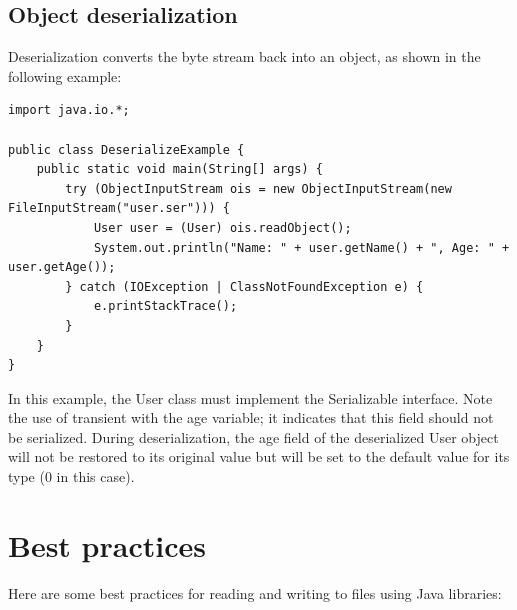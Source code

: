 \subsection{Object deserialization}


Deserialization converts the byte stream back into an object, as shown in the following example:

\begin{lstlisting}
import java.io.*;

public class DeserializeExample {
    public static void main(String[] args) {
        try (ObjectInputStream ois = new ObjectInputStream(new FileInputStream("user.ser"))) {
            User user = (User) ois.readObject();
            System.out.println("Name: " + user.getName() + ", Age: " + user.getAge());
        } catch (IOException | ClassNotFoundException e) {
            e.printStackTrace();
        }
    }
}
\end{lstlisting}

In this example, the User class must implement the Serializable interface. Note the use of transient with the age variable; it indicates that this field should not be serialized. During deserialization, the age field of the deserialized User object will not be restored to its original value but will be set to the default value for its type (0 in this case).




\section{Best practices}

Here are some best practices for reading and writing to files using Java libraries:

